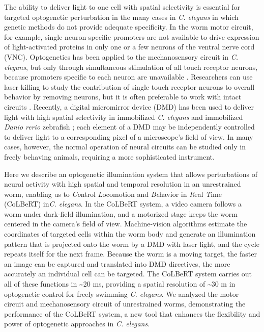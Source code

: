 The ability to deliver light to one cell with spatial selectivity is essential for targeted optogenetic perturbation in the many cases in \textit{C. elegans} in which genetic methods do not provide adequate specificity. In the worm motor circuit, for example, single neuron-specific promoters are not available to drive expression of light-activated proteins in only one or a few neurons of the ventral nerve cord (VNC).
Optogenetics has been applied to the mechanosensory circuit in \textit{C. elegans}, but only through simultaneous stimulation of all touch receptor neurons, because promoters specific to each neuron are unavailable \citep{nagel_channelrhodopsin-2_2003}. 
Researchers can use laser killing to study the contribution of single touch receptor neurons to overall behavior by removing neurons, but it is often preferable to work with intact circuits \citep{chalfie_neural_1985, wicks_dynamic_1996, kitamura_contribution_2001}.
Recently, a digital micromirror device (DMD) has been used to deliver light with high spatial selectivity in immobilized \textit{C. elegans} and immobilized \textit{Danio rerio} zebrafish \citep{wyart_optogenetic_2009}; each element of a DMD may be independently controlled to deliver light to a corresponding pixel of a microscope's field of view. 
In many cases, however, the normal operation of neural circuits can be studied only in freely behaving animals, requiring a more sophisticated instrument.

Here we describe an optogenetic illumination system that allows perturbations of neural activity with high spatial and temporal resolution in an unrestrained worm, enabling us to \emph{Co}ntrol \emph{L}ocomotion and \emph{Be}havior in \emph{R}eal \emph{T}ime (CoLBeRT) in\textit{C. elegans}. In the CoLBeRT system, a video camera follows a worm under dark-field illumination, and a motorized stage keeps the worm centered in the camera's field of view. Machine-vision algorithms estimate the coordinates of targeted cells within the worm body and generate an illumination pattern that is projected onto the worm by a DMD with laser light, and the cycle repeats itself for the next frame. Because the worm is a moving target, the faster an image can be captured and translated into DMD directives, the more accurately an individual cell can be targeted. The CoLBeRT system carries out all of these functions in \textasciitilde20 ms, providing a spatial resolution of \textasciitilde30 \textmu m in optogenetic control for freely swimming \textit{C. elegans}. We analyzed the motor circuit and mechanosensory circuit of unrestrained worms, demonstrating the performance of the CoLBeRT system, a new tool that enhances the flexibility and power of optogenetic approaches in \textit{C. elegans}.

